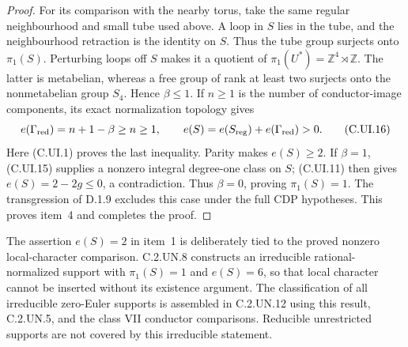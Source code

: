 \begin{proof}
For its comparison with the nearby torus,
take the same regular neighbourhood and
small tube used above. A loop in $S$ lies
in the tube, and the neighbourhood retraction
is the identity on $S$. Thus the tube group
surjects onto $\pi_1(S)$. Perturbing loops
off $S$ makes it a quotient of
$\pi_1(U^*)=\mathbb Z^4\rtimes\mathbb Z$.
The latter is metabelian, whereas a free
group of rank at least two surjects onto
the nonmetabelian group $S_4$. Hence
$\beta\le1$. If $n\ge1$ is the number
of conductor-image components, its exact
normalization topology gives
\[
 e(\Gamma_{\rm red})=n+1-\beta\ge n\ge1,
 \qquad e(S)=e(S_{\rm reg})+e(\Gamma_{\rm red})>0.
 \tag{C.UI.16}
\]
Here (C.UI.1) proves the last inequality.
Parity makes $e(S)\ge2$. If $\beta=1$,
(C.UI.15) supplies a nonzero integral
degree-one class on $S$; (C.UI.11) then
gives $e(S)=2-2g\le0$, a contradiction.
Thus $\beta=0$, proving $\pi_1(S)=1$.
The transgression of D.1.9 excludes this
case under the full CDP hypotheses. This
proves item~4 and completes the proof.
\end{proof}

The assertion $e(S)=2$ in item~1 is deliberately tied
to the proved nonzero local-character comparison.
C.2.UN.8 constructs an irreducible rational-normalized
support with $\pi_1(S)=1$ and $e(S)=6$, so that
local character cannot be inserted without its
existence argument. The classification of all
irreducible zero-Euler supports is assembled in
C.2.UN.12 using this result, C.2.UN.5, and the
class VII conductor comparisons. Reducible
unrestricted supports are not covered by this
irreducible statement.
